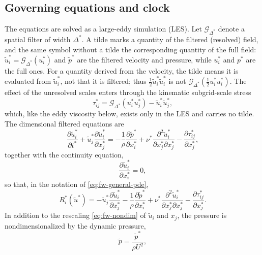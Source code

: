 \documentclass{article}
\begin{document}
\subsection{Governing equations and clock}\label{ssec:ns-clock}

The equations are solved as a large-eddy simulation (LES). Let
$\mathcal{G}_{\Delta^*}$ denote a spatial filter of width $\Delta^*$. A tilde
marks a quantity of the filtered (resolved) field, and the same symbol without
a tilde the corresponding quantity of the full field: $\tilde u_i^* =
\mathcal{G}_{\Delta^*}(u_i^*)$ and $\tilde p^*$ are the filtered velocity and
pressure, while $u_i^*$ and $p^*$ are the full ones. For a quantity derived
from the velocity, the tilde means it is evaluated from $\tilde u_i^*$, not
that it is filtered; thus $\tfrac12 \tilde u_i^* \tilde u_i^*$ is not
$\mathcal{G}_{\Delta^*}(\tfrac12 u_i^* u_i^*)$. The effect of the unresolved
scales enters through the kinematic subgrid-scale stress
\begin{equation}\label{eq:ns-sgs-def}
  \tau_{ij}^* = \mathcal{G}_{\Delta^*}(u_i^* u_j^*) - \tilde u_i^* \tilde u_j^*,
\end{equation}
which, like the eddy viscosity below, exists only in the LES and carries no
tilde. The dimensional filtered equations are
\begin{equation}\label{eq:ns-momentum}
  \frac{\partial \tilde u_i^*}{\partial t^*} + \tilde u_j^* \frac{\partial \tilde u_i^*}{\partial x_j^*}= -\frac{1}{\rho}\frac{\partial \tilde p^*}{\partial x_i^*} + \nu^* \frac{\partial^2 \tilde u_i^*}{\partial x_j^* \partial x_j^*} - \frac{\partial \tau_{ij}^*}{\partial x_j^*},
\end{equation}
together with the continuity equation,
\begin{equation}\label{eq:ns-continuity}
  \frac{\partial \tilde u_i^*}{\partial x_i^*} = 0,
\end{equation}
so that, in the notation of \eqref{eq:fw-general-pde},
\begin{equation}\label{eq:ns-rhs}
  R_i^*(\tilde u^*) = - \tilde u_j^* \frac{\partial \tilde u_i^*}{\partial x_j^*}
  - \frac{1}{\rho}\frac{\partial \tilde p^*}{\partial x_i^*}
  + \nu^* \frac{\partial^2 \tilde u_i^*}{\partial x_j^* \partial x_j^*}
  - \frac{\partial \tau_{ij}^*}{\partial x_j^*}.
\end{equation}
In addition to the rescaling \eqref{eq:fw-nondim} of $\tilde u_i$ and $x_j$, the
pressure is nondimensionalized by the dynamic pressure,
\begin{equation}\label{eq:ns-pressure-nondim}
  \tilde p = \frac{\tilde p^*}{\rho U^2},
\end{equation}
\end{document}
